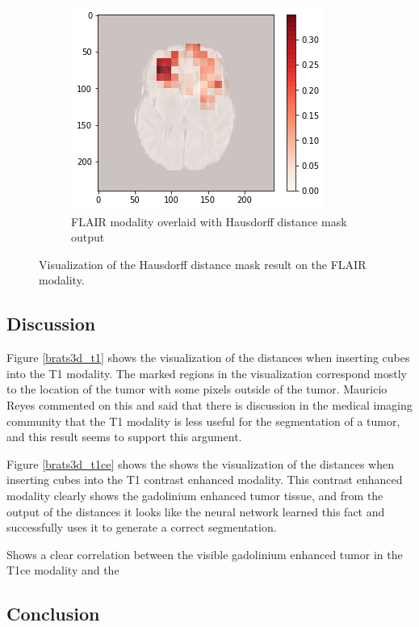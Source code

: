 \begin{figure}[H]
\begin{subfigure}{.33\textwidth}
    \end{subfigure}
        \begin{subfigure}{.33\textwidth}
        \centering
        \includegraphics[width=\linewidth]{chapters/07_brats3d/images/12_flair_hdm.png}
        \caption{FLAIR modality overlaid with Hausdorff distance mask output}
    \end{subfigure}
    \caption{Visualization of the Hausdorff distance mask result on the FLAIR modality.}
    \label{brats3d_flair}
\end{figure}

\subsection{Discussion}
Figure \ref{brats3d_t1} shows the visualization of the distances when inserting cubes into the T1 modality. The marked regions in the visualization correspond mostly to the location of the tumor with some pixels outside of the tumor. Mauricio Reyes commented on this and said that there is discussion in the medical imaging community that the T1 modality is less useful for the segmentation of a tumor, and this result seems to support this argument.

Figure \ref{brats3d_t1ce} shows the  shows the visualization of the distances when inserting cubes into the T1 contrast enhanced modality. This contrast enhanced modality clearly shows the gadolinium enhanced tumor tissue, and from the output of the distances it looks like the neural network learned this fact and successfully uses it to generate a correct segmentation.

Shows a clear correlation between the visible gadolinium enhanced tumor in the T1ce modality and the
\subsection{Conclusion}
